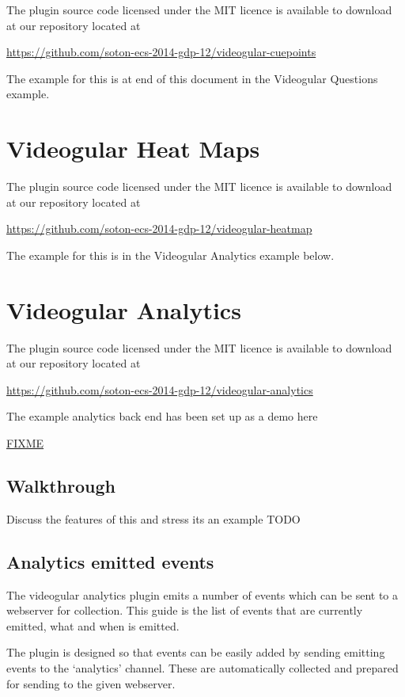 \documentclass[12pt,a4paper]{article}
\begin{document}
The plugin source code licensed under the MIT licence is available to download at our repository located at 

\url{https://github.com/soton-ecs-2014-gdp-12/videogular-cuepoints}

The example for this is at end of this document in the Videogular Questions example.

\section*{Videogular Heat Maps}

The plugin source code licensed under the MIT licence is available to download at our repository located at 

\url{https://github.com/soton-ecs-2014-gdp-12/videogular-heatmap}

The example for this is in the Videogular Analytics example below.

\section*{Videogular Analytics}

The plugin source code licensed under the MIT licence is available to download at our repository located at 

\url{https://github.com/soton-ecs-2014-gdp-12/videogular-analytics}

The example analytics back end has been set up as a demo here

\url{FIXME}

\subsection{Walkthrough}

Discuss the features of this and stress its an example TODO

\subsection*{Analytics emitted events}

The videogular analytics plugin emits a number of events which can be sent to a webserver for collection. This guide is the list of events that are currently emitted, what and when is emitted.

The plugin is designed so that events can be easily added by sending emitting events to the `analytics' channel. These are automatically collected and prepared for sending to the given webserver.
\end{document}
